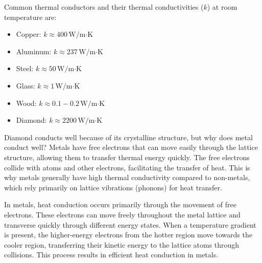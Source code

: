 \documentclass[11pt]{report}
\begin{document}
\begin{definition}
    Common thermal conductors and their thermal conductivities ($k$) at room temperature are:
    \begin{itemize}
        \item Copper: $k \approx 400\, \text{W/m·K}$
        \item Aluminum: $k \approx 237\, \text{W/m·K}$
        \item Steel: $k \approx 50\, \text{W/m·K}$
        \item Glass: $k \approx 1\, \text{W/m·K}$
        \item Wood: $k \approx 0.1 - 0.2\, \text{W/m·K}$
        \item Diamond: $k \approx 2200\, \text{W/m·K}$
    \end{itemize}
\end{definition}

Diamond conducts well because of its crystalline structure, but why does metal conduct well? Metals have free electrons that can move easily through the lattice structure, allowing them to transfer thermal energy quickly. The free electrons collide with atoms and other electrons, facilitating the transfer of heat. This is why metals generally have high thermal conductivity compared to non-metals, which rely primarily on lattice vibrations (phonons) for heat transfer.
\begin{definition}
    In metals, heat conduction occurs primarily through the movement of free electrons. These electrons can move freely throughout the metal lattice and transverse quickly through different energy states. When a temperature gradient is present, the higher-energy electrons from the hotter region move towards the cooler region, transferring their kinetic energy to the lattice atoms through collisions. This process results in efficient heat conduction in metals.
\end{definition}
\end{document}

